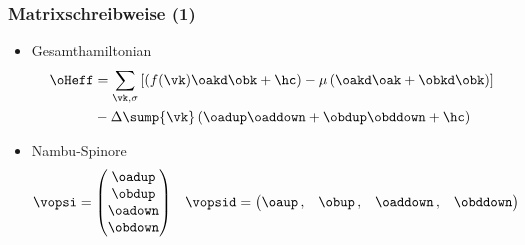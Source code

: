 
\begin{frame}
    \frametitle{Matrixschreibweise (1)}
    \begin{itemize}
        \item Gesamthamiltonian 
        \begin{align*}
            \oHeff &= \sum_{\vk, \sigma} \left[\left(f(\vk) \oakd \obk +\hc\right) - \mu \left( \oakd \oak + \obkd \obk \right) \right]  \\
            &- \Delta \sump{\vk} \left(\oadup \oaddown + \obdup \obddown + \hc \right) 
        \end{align*}
        \item Nambu-Spinore 
        \begin{align*}
            \vopsi &= \begin{pmatrix} \oadup \\  \obdup \\ \oadown \\ \obdown \end{pmatrix} & \vopsid = \begin{pmatrix} \oaup \, , & \obup\, , & \oaddown\, , & \obddown\end{pmatrix}
        \end{align*}
    \end{itemize}
\end{frame}


